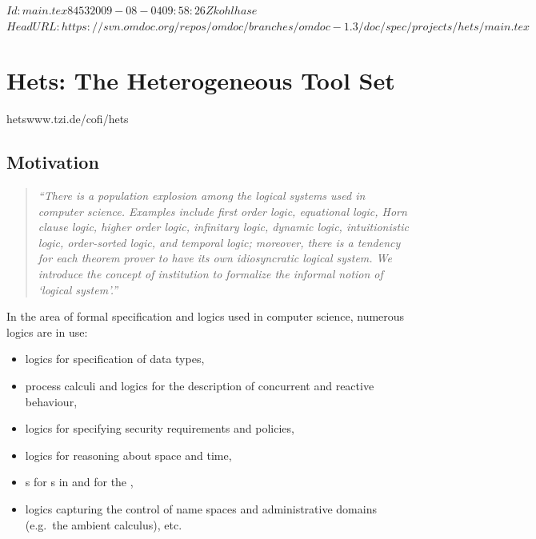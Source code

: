 \svnInfo $Id: main.tex 8453 2009-08-04 09:58:26Z kohlhase $
\svnKeyword $HeadURL: https://svn.omdoc.org/repos/omdoc/branches/omdoc-1.3/doc/spec/projects/hets/main.tex $

\section[{\sc{Hets}}]{Hets: The Heterogeneous Tool Set}
\begin{project}{hets}{www.tzi.de/cofi/hets}
\end{project}

\subsection{Motivation}

\begin{quote}\sl\small
  ``There is a population explosion among the logical systems used in computer
  science. Examples include first order logic, equational logic, Horn clause logic, higher
  order logic, infinitary logic, dynamic logic, intuitionistic logic, order-sorted logic,
  and temporal logic; moreover, there is a tendency for each theorem prover to have its
  own idiosyncratic logical system. We introduce the concept of \emph{institution} to
  formalize the informal notion of `logical system'.''~\cite{GoguenBurstall92}
\end{quote}

In the area of formal specification and logics used in computer
science, numerous logics are in use:
\begin{itemize}
\item logics for specification of data types,
\item process calculi and logics for the description of concurrent
  and reactive behaviour,
\item logics for specifying security requirements and policies,
\item logics for reasoning about space and time,
\item {s} for {s} in
  {} and for the {},
\item logics capturing the control of name spaces and administrative domains (e.g.\ the
  ambient calculus), etc.
\end{itemize}


